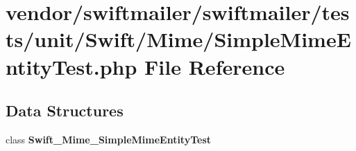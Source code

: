 \section{vendor/swiftmailer/swiftmailer/tests/unit/\+Swift/\+Mime/\+Simple\+Mime\+Entity\+Test.php File Reference}
\label{_simple_mime_entity_test_8php}
\subsection*{Data Structures}
\begin{DoxyCompactItemize}
\item 
class {\bf Swift\+\_\+\+Mime\+\_\+\+Simple\+Mime\+Entity\+Test}
\end{DoxyCompactItemize}

